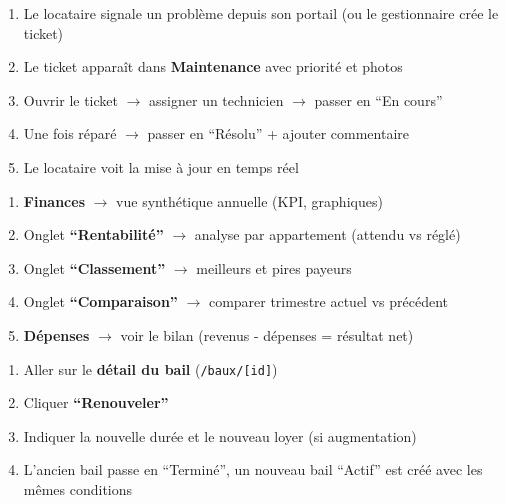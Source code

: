 \documentclass[12pt,a4paper]{article}
\begin{document}
\begin{flowbox}
\begin{enumerate}
\item Le locataire signale un probl\`eme depuis son portail (ou le gestionnaire cr\'ee le ticket)
\item Le ticket appara\^it dans \textbf{Maintenance} avec priorit\'e et photos
\item Ouvrir le ticket $\rightarrow$ assigner un technicien $\rightarrow$ passer en ``En cours''
\item Une fois r\'epar\'e $\rightarrow$ passer en ``R\'esolu'' + ajouter commentaire
\item Le locataire voit la mise \`a jour en temps r\'eel
\end{enumerate}
\end{flowbox}

\begin{flowbox}
\begin{enumerate}
\item \textbf{Finances} $\rightarrow$ vue synth\'etique annuelle (KPI, graphiques)
\item Onglet \textbf{``Rentabilit\'e''} $\rightarrow$ analyse par appartement (attendu vs r\'egl\'e)
\item Onglet \textbf{``Classement''} $\rightarrow$ meilleurs et pires payeurs
\item Onglet \textbf{``Comparaison''} $\rightarrow$ comparer trimestre actuel vs pr\'ec\'edent
\item \textbf{D\'epenses} $\rightarrow$ voir le bilan (revenus - d\'epenses = r\'esultat net)
\end{enumerate}
\end{flowbox}

\begin{flowbox}
\begin{enumerate}
\item Aller sur le \textbf{d\'etail du bail} (\texttt{/baux/[id]})
\item Cliquer \textbf{``Renouveler''}
\item Indiquer la nouvelle dur\'ee et le nouveau loyer (si augmentation)
\item L'ancien bail passe en ``Termin\'e'', un nouveau bail ``Actif'' est cr\'e\'e avec les m\^emes conditions
\end{enumerate}
\end{flowbox}
\end{document}

